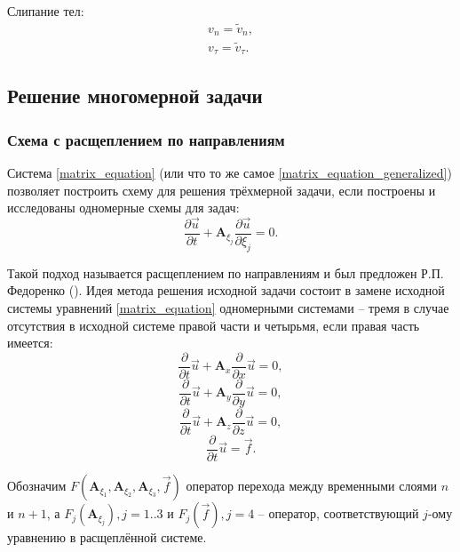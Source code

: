 Слипание тел:
\begin{eqnarray}
v_n=\tilde{v}_n,\nonumber\\
v_\tau=\tilde{v}_\tau.
\end{eqnarray}


\clearpage
\newpage

\subsection{Решение многомерной задачи}

\subsubsection{Схема с расщеплением по направлениям}

Система \ref{matrix_equation} (или что то же самое \ref{matrix_equation_generalized}) позволяет построить схему для решения трёхмерной задачи, если построены и исследованы одномерные схемы для задач:
\begin{equation}
\frac{\partial\vec{u}}{\partial{t}} + \mathbf{A}_{\xi_j} \frac{\partial\vec{u}}{\partial{\xi_j}} = 0.
\end{equation}

Такой подход называется расщеплением по направлениям и был предложен Р.П. Федоренко (\cite{fedorenko}). Идея метода решения исходной задачи состоит в замене исходной системы уравнений \ref{matrix_equation} одномерными системами -- тремя в случае отсутствия в исходной системе правой части и четырьмя, если правая часть имеется:
\begin{equation}
\frac{\partial}{\partial t}\vec u+\mathbf{A}_x \frac{\partial}{\partial x}\vec u
= 0,
\label{matrix_equation_x}
\end{equation}
\begin{equation}
\frac{\partial}{\partial t}\vec u+\mathbf{A}_y \frac{\partial}{\partial y}\vec u
= 0,
\label{matrix_equation_y}
\end{equation}
\begin{equation}
\frac{\partial}{\partial t}\vec u+\mathbf{A}_z \frac{\partial}{\partial z}\vec u
= 0,
\label{matrix_equation_z}
\end{equation}
\begin{equation}
\frac{\partial}{\partial t}\vec u = \vec f.
\label{matrix_equation_f}
\end{equation}

Обозначим $F(\mathbf A_{\xi_1}, \mathbf A_{\xi_2}, \mathbf A_{\xi_3}, \vec f)$ оператор перехода между временными слоями $n$ и $n+1$, а $F_j(\mathbf A_{\xi_j}), j=1..3$ и $F_j(\vec f), j=4$ -- оператор, соответствующий $j$-ому уравнению в расщеплённой системе.

